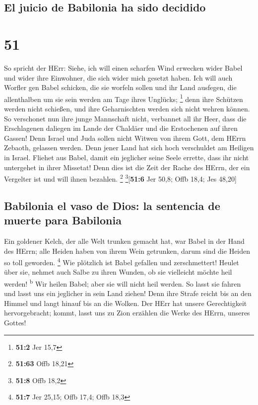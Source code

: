 \hypertarget{el-juicio-de-babilonia-ha-sido-decidido}{%
\subsection{El juicio de Babilonia ha sido
decidido}\label{el-juicio-de-babilonia-ha-sido-decidido}}

\hypertarget{section-50}{%
\section{51}\label{section-50}}

 So spricht der HErr: Siehe, ich will einen scharfen Wind
erwecken wider Babel und wider ihre Einwohner, die sich wider mich
gesetzt haben.  Ich will auch Worfler gen Babel schicken,
die sie worfeln sollen und ihr Land ausfegen, die allenthalben um sie
sein werden am Tage ihres Unglücks; \footnote{\textbf{51:2} Jer 15,7}
 denn ihre Schützen werden nicht schießen, und ihre
Geharnischten werden sich nicht wehren können. So verschonet nun ihre
junge Mannschaft nicht, verbannet all ihr Heer,  dass die
Erschlagenen daliegen im Lande der Chaldäer und die Erstochenen auf
ihren Gassen!  Denn Israel und Juda sollen nicht Witwen
von ihrem Gott, dem HErrn Zebaoth, gelassen werden. Denn jener Land hat
sich hoch verschuldet am Heiligen in Israel.  Fliehet aus
Babel, damit ein jeglicher seine Seele errette, dass ihr nicht
untergehet in ihrer Missetat! Denn dies ist die Zeit der Rache des
HErrn, der ein Vergelter ist und will ihnen bezahlen. \footnote{\textbf{51:63}
  Offb 18,21} \footnote{\textbf{51:8} Offb 18,2}{[}\textbf{51:6} Jer
50,8; Offb 18,4; Jes 48,20{]}

\hypertarget{babilonia-el-vaso-de-dios-la-sentencia-de-muerte-para-babilonia}{%
\subsection{Babilonia el vaso de Dios: la sentencia de muerte para
Babilonia}\label{babilonia-el-vaso-de-dios-la-sentencia-de-muerte-para-babilonia}}

 Ein goldener Kelch, der alle Welt trunken gemacht hat,
war Babel in der Hand des HErrn; alle Heiden haben von ihrem Wein
getrunken, darum sind die Heiden so toll geworden. \footnote{\textbf{51:7}
  Jer 25,15; Offb 17,4; Offb 18,3}  Wie plötzlich ist
Babel gefallen und zerschmettert! Heulet über sie, nehmet auch Salbe zu
ihren Wunden, ob sie vielleicht möchte heil werden! \textsuperscript{b}
 Wir heilen Babel; aber sie will nicht heil werden. So
lasst sie fahren und lasst uns ein jeglicher in sein Land ziehen! Denn
ihre Strafe reicht bis an den Himmel und langt hinauf bis an die Wolken.
 Der HErr hat unsere Gerechtigkeit hervorgebracht; kommt,
lasst uns zu Zion erzählen die Werke des HErrn, unseres Gottes!

